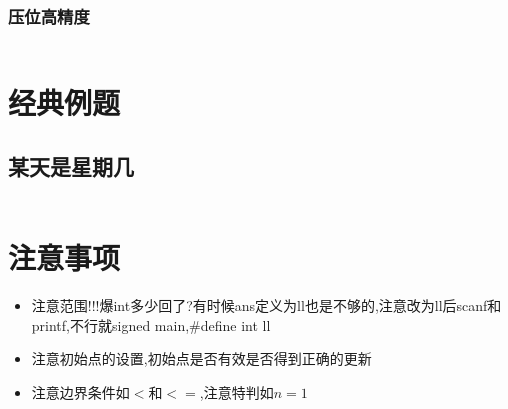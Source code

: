 \documentclass[a4paper,11pt]{article}
\begin{document}
\subsubsection{压位高精度}
\inputminted[breaklines,linenos,frame=leftline]{c++}{others/bignum1.cpp}

\newpage
\section{经典例题}
\subsection{某天是星期几}
\inputminted[breaklines]{c++}{question/1.cpp}



\newpage
\section{注意事项}
\begin{itemize}
    \item 注意范围!!!爆int多少回了?有时候ans定义为ll也是不够的,注意改为ll后scanf和printf,不行就signed main,\#define int ll
    \item 注意初始点的设置,初始点是否有效是否得到正确的更新
    \item 注意边界条件如$<$和$<=$,注意特判如$n=1$
\end{itemize}
\end{document}
